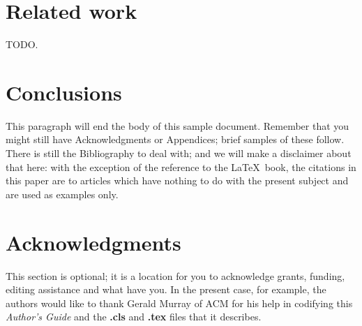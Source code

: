 \documentclass{vldb}
\begin{document}

\section{Related work}

TODO.

\section{Conclusions}
This paragraph will end the body of this sample document.
Remember that you might still have Acknowledgments or
Appendices; brief samples of these
follow.  There is still the Bibliography to deal with; and
we will make a disclaimer about that here: with the exception
of the reference to the \LaTeX\ book, the citations in
this paper are to articles which have nothing to
do with the present subject and are used as
examples only.

\balance

\section{Acknowledgments}
This section is optional; it is a location for you
to acknowledge grants, funding, editing assistance and
what have you.  In the present case, for example, the
authors would like to thank Gerald Murray of ACM for
his help in codifying this \textit{Author's Guide}
and the \textbf{.cls} and \textbf{.tex} files that it describes.




\end{document}
